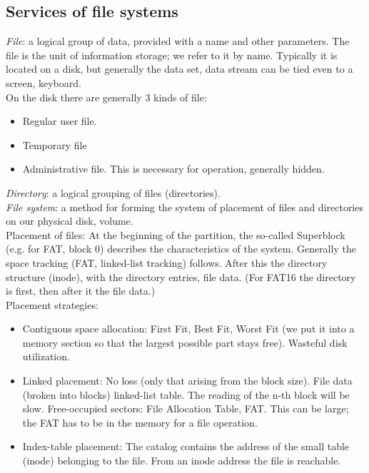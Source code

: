 \documentclass[margin=0px]{article}
\begin{document}
\subsection{Services of file systems}

\textit{File}: a logical group of data, provided with a name and other parameters. The file is the unit of information storage; we refer to it by name. Typically it is located on a disk, but generally the data set, data stream can be tied even to a screen, keyboard. \\
On the disk there are generally 3 kinds of file:
\begin{itemize}
    \item Regular user file.
    \item Temporary file
    \item Administrative file. This is necessary for operation, generally hidden.
\end{itemize}
\textit{Directory}: a logical grouping of files (directories). \\
\textit{File system}: a method for forming the system of placement of files and directories on our physical disk, volume. \\
Placement of files: At the beginning of the partition, the so-called Superblock (e.g. for FAT, block 0) describes the characteristics of the system. Generally the space tracking (FAT, linked-list tracking) follows. After this the directory structure (inode), with the directory entries, file data. (For FAT16 the directory is first, then after it the file data.) \\
Placement strategies:
\begin{itemize}
    \item Contiguous space allocation: First Fit, Best Fit, Worst Fit (we put it into a memory section so that the largest possible part stays free). Wasteful disk utilization.
    \item Linked placement: No loss (only that arising from the block size). File data (broken into blocks) linked-list table. The reading of the n-th block will be slow. Free-occupied sectors: File Allocation Table, FAT. This can be large; the FAT has to be in the memory for a file operation.
    \item Index-table placement: The catalog contains the address of the small table (inode) belonging to the file. From an inode address the file is reachable.
\end{itemize}
\end{document}
